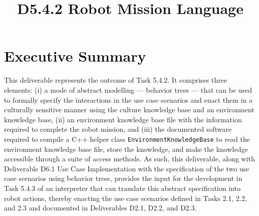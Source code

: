 \documentclass{CSSRforAfrica}
\begin{document}



\title{D5.4.2 Robot Mission Language}   





\maketitle
 

\section*{Executive Summary}
\label{executive_summary}
 
This deliverable  represents the outcome of Task 5.4.2.  It comprises three elements: (i) a mode of abstract modelling ---  behavior trees --- that can be used to formally specify the interactions in the use case scenarios  and enact them in a culturally sensitive manner using the  culture knowledge base and an environment knowledge base, 
(ii) an environment knowledge base file with the  information required to complete the robot mission, and 
(iii) the documented software required to compile a C++ helper class  {\small \tt EnvironmentKnowledgeBase} to read the environment knowledge base file, store the knowledge, and make the knowledge accessible through a suite of access methods. As such, this deliverable, along with Deliverable D6.1 Use Case Implementation with the specification of the two use case scenarios using behavior trees, provides the input for the development in Task 5.4.3 of an interpreter that can translate this abstract specification into robot actions, thereby  enacting the use case scenarios defined in Tasks 2.1, 2.2, and 2.3 and documented in  Deliverables D2.1, D2.2, and D2.3.  
\end{document}
